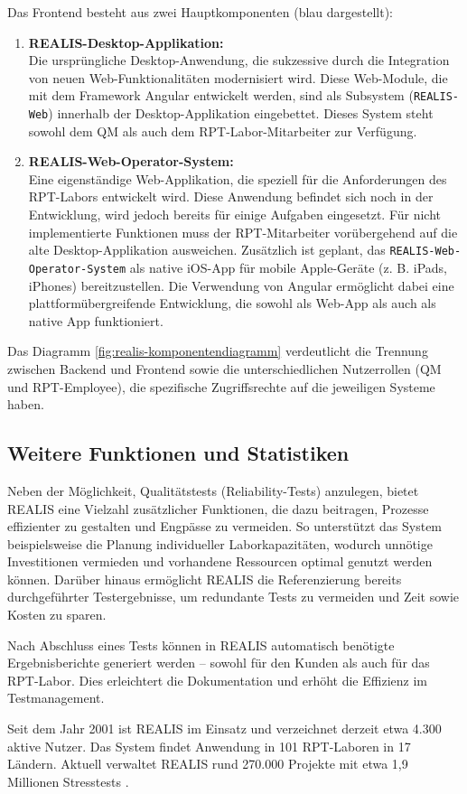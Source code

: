 Das Frontend besteht aus zwei Hauptkomponenten (blau dargestellt):
\begin{enumerate}
    \item \textbf{REALIS-Desktop-Applikation:} \\
Die ursprüngliche Desktop-Anwendung, die sukzessive durch die Integration von neuen Web-Funktionalitäten modernisiert wird. Diese Web-Module, die mit dem Framework Angular entwickelt werden, sind als Subsystem (\texttt{REALIS-Web}) innerhalb der Desktop-Applikation eingebettet. Dieses System steht sowohl dem \gls{QM} als auch dem \gls{RPT}-Labor-Mitarbeiter zur Verfügung.

\item \textbf{REALIS-Web-Operator-System:} \\
Eine eigenständige Web-Applikation, die speziell für die Anforderungen des \gls{RPT}-Labors entwickelt wird. Diese Anwendung befindet sich noch in der Entwicklung, wird jedoch bereits für einige Aufgaben eingesetzt. Für nicht implementierte Funktionen muss der \gls{RPT}-Mitarbeiter vorübergehend auf die alte Desktop-Applikation ausweichen. Zusätzlich ist geplant, das \texttt{REALIS-Web-Operator-System} als native iOS-App für mobile Apple-Geräte (z. B. iPads, iPhones) bereitzustellen. Die Verwendung von Angular ermöglicht dabei eine plattformübergreifende Entwicklung, die sowohl als Web-App als auch als native App funktioniert.
\end{enumerate}

Das Diagramm \ref{fig:realis-komponentendiagramm} verdeutlicht die Trennung zwischen Backend und Frontend sowie die unterschiedlichen Nutzerrollen (\gls{QM} und \gls{RPT}-Employee), die spezifische Zugriffsrechte auf die jeweiligen Systeme haben.


\subsection{Weitere Funktionen und Statistiken}
Neben der Möglichkeit, Qualitätstests (Reliability-Tests) anzulegen, bietet \gls{REALIS} eine Vielzahl zusätzlicher Funktionen, die dazu beitragen, Prozesse effizienter zu gestalten und Engpässe zu vermeiden. So unterstützt das System beispielsweise die Planung individueller Laborkapazitäten, wodurch unnötige Investitionen vermieden und vorhandene Ressourcen optimal genutzt werden können. Darüber hinaus ermöglicht \gls{REALIS} die Referenzierung bereits durchgeführter Testergebnisse, um redundante Tests zu vermeiden und Zeit sowie Kosten zu sparen.

Nach Abschluss eines Tests können in \gls{REALIS} automatisch benötigte Ergebnisberichte generiert werden – sowohl für den Kunden als auch für das \gls{RPT}-Labor. Dies erleichtert die Dokumentation und erhöht die Effizienz im Testmanagement.

Seit dem Jahr 2001 ist \gls{REALIS} im Einsatz und verzeichnet derzeit etwa 4.300 aktive Nutzer. Das System findet Anwendung in 101 \gls{RPT}-Laboren in 17 Ländern. Aktuell verwaltet \gls{REALIS} rund 270.000 Projekte mit etwa 1,9 Millionen Stresstests \cite{REALISPowerPointIntern}.